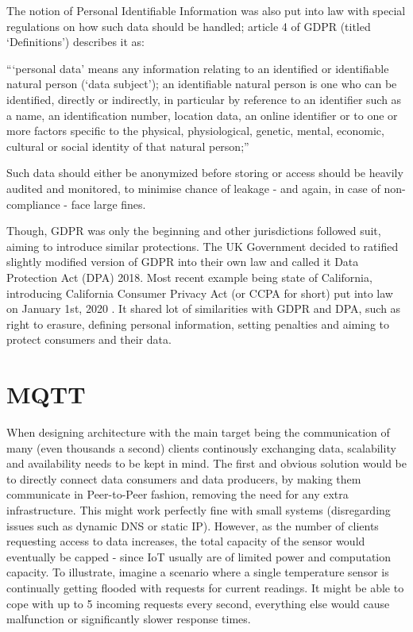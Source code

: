 The notion of Personal Identifiable Information was also put into law with special regulations on how such data should be handled; article 4 of GDPR (titled `Definitions') describes it as:
\begin{displayquote}
``‘personal data’ means any information relating to an identified or identifiable natural person (‘data subject’); an identifiable natural person is one who can be identified, directly or indirectly, in particular by reference to an identifier such as a name, an identification number, location data, an online identifier or to one or more factors specific to the physical, physiological, genetic, mental, economic, cultural or social identity of that natural person;''
\end{displayquote}
Such data should either be anonymized before storing or access should be heavily audited and monitored, to minimise chance of leakage - and again, in case of non-compliance - face large fines.

Though, GDPR was only the beginning and other jurisdictions followed suit, aiming to introduce similar protections. The UK Government decided to ratified slightly modified version of GDPR into their own law and called it Data Protection Act (DPA) 2018. Most recent example being state of California, introducing California Consumer Privacy Act (or CCPA for short) put into law on January 1st, 2020 \citep{CCPA}. It shared lot of similarities with GDPR and DPA, such as right to erasure, defining personal information, setting penalties and aiming to protect consumers and their data.

\section{MQTT}
When designing architecture with the main target being the communication of many (even thousands a second) clients continously exchanging data, scalability and availability needs to be kept in mind. The first and obvious solution would be to directly connect data consumers and data producers, by making them communicate in Peer-to-Peer fashion, removing the need for any extra infrastructure. This might work perfectly fine with small systems (disregarding issues such as dynamic DNS or static IP). However, as the number of clients requesting access to data increases, the total capacity of the sensor would eventually be capped - since IoT usually are of limited power and computation capacity. To illustrate, imagine a scenario where a single temperature sensor is continually getting flooded with requests for current readings. It might be able to cope with  up to 5 incoming requests every second, everything else would cause malfunction or significantly slower response times.

